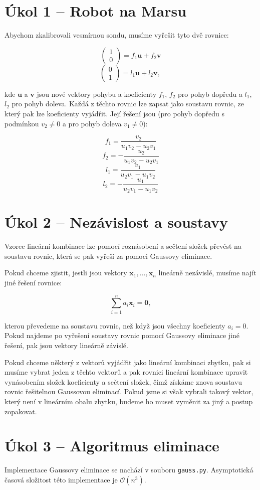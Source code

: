 \documentclass{fkssolpub}
\author{Ondřej Sedláček}
\begin{document}
\section{Úkol 1 -- Robot na Marsu}

Abychom zkalibrovali vesmírnou sondu, musíme vyřešit tyto dvě rovnice:

\[
  \begin{pmatrix}
    1 \\ 0
  \end{pmatrix} = f_1 \mathbf{u} + f_2 \mathbf{v} 
\]
\[
  \begin{pmatrix}
    0 \\ 1
  \end{pmatrix} = l_1 \mathbf{u} + l_2 \mathbf{v} \text{, }
\]

kde $\mathbf{u}$ a $\mathbf{v}$ jsou nové vektory pohybu a koeficienty
$f_1$, $f_2$ pro pohyb dopředu a $l_1$, $l_2$ pro pohyb doleva. Každá z těchto
rovnic lze zapsat jako soustavu rovnic, ze který pak lze koeficienty vyjádřit.
Její řešení jsou (pro pohyb dopředu s podmínkou $v_2 \neq 0$ a pro pohyb doleva
$v_1 \neq 0$):

\[
  f_1 = \frac{v_2}{u_1 v_2 - u_2 v_1}
\]
\[
  f_2 = -\frac{u_2}{u_1 v_2 - u_2 v_1}
\]
\[
  l_1 = \frac{v_1}{u_2 v_1 - u_1 v_2}
\]
\[
  l_2 = - \frac{u_1}{u_2 v_1 - u_1 v_2}
\]

\section{Úkol 2 -- Nezávislost a soustavy}

Vzorec lineární kombinace lze pomocí roznásobení a sečtení složek převést
na soustavu rovnic, která se pak vyřeší za pomoci Gaussovy eliminace.

Pokud chceme zjistit, jestli jsou vektory $\mathbf{x}_1, ..., \mathbf{x}_n$
lineárně nezávislé, musíme najít jiné řešení rovnice:

\[
  \sum_{i=1}^n a_i \mathbf{x}_i = \mathbf{0},
\]

kterou převedeme na soustavu rovnic, než když jsou všechny koeficienty
$a_i = 0$. Pokud najdeme po vyřešení soustavy rovnic pomocí Gaussovy eliminace 
jiné řešení, pak jsou vektory lineárně závislé.

Pokud chceme některý z vektorů vyjádřit jako lineární kombinaci zbytku, pak si
musíme vybrat jeden z těchto vektorů a pak rovnici lineární kombinace upravit
vynásobením složek koeficienty a sečtení složek, čímž získáme znova soustavu
rovnic řešitelnou Gaussovou eliminací. Pokud jsme si však vybrali takový vektor,
který není v lineárním obalu zbytku, budeme ho muset vyměnit za jiný a postup
zopakovat.

\section{Úkol 3 -- Algoritmus eliminace}

Implementace Gaussovy eliminace se nachází v souboru \verb|gauss.py|.
Asymptotická časová složitost této implementace je $\mathcal{O}(n^3)$.
\end{document}
